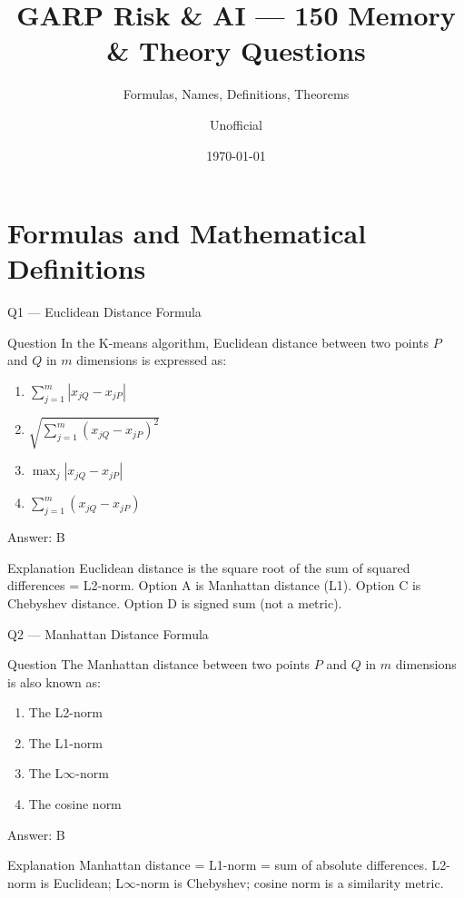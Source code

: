 \documentclass[aspectratio=169,8pt]{beamer}
\title[GARP RAI]{GARP Risk \& AI --- 150 Memory \& Theory Questions}
\subtitle{Formulas, Names, Definitions, Theorems}
\author{Unofficial}
\date{\today}
\begin{document}
	
	\begin{frame}
		\titlepage
	\end{frame}
	
	\section{Formulas and Mathematical Definitions}
	
	\begin{frame}{Q1 --- Euclidean Distance Formula}
		\begin{block}{Question}
			In the K-means algorithm, Euclidean distance between two points $P$ and $Q$ in $m$ dimensions is expressed as:
			\begin{enumerate}
				\item $\sum_{j=1}^{m} |x_{jQ} - x_{jP}|$
				\item $\sqrt{\sum_{j=1}^{m} (x_{jQ} - x_{jP})^2}$
				\item $\max_j |x_{jQ} - x_{jP}|$
				\item $\sum_{j=1}^{m} (x_{jQ} - x_{jP})$
			\end{enumerate}
		\end{block}
		\begin{exampleblock}{Answer: B}\end{exampleblock}
		\begin{block}{Explanation}
			Euclidean distance is the square root of the sum of squared differences = L2-norm. Option A is Manhattan distance (L1). Option C is Chebyshev distance. Option D is signed sum (not a metric).
		\end{block}
	\end{frame}
	
	\begin{frame}{Q2 --- Manhattan Distance Formula}
		\begin{block}{Question}
			The Manhattan distance between two points $P$ and $Q$ in $m$ dimensions is also known as:
			\begin{enumerate}
				\item The L2-norm
				\item The L1-norm
				\item The L$\infty$-norm
				\item The cosine norm
			\end{enumerate}
		\end{block}
		\begin{exampleblock}{Answer: B}\end{exampleblock}
		\begin{block}{Explanation}
			Manhattan distance = L1-norm = sum of absolute differences. L2-norm is Euclidean; L$\infty$-norm is Chebyshev; cosine norm is a similarity metric.
		\end{block}
	\end{frame}
	
\end{document}
